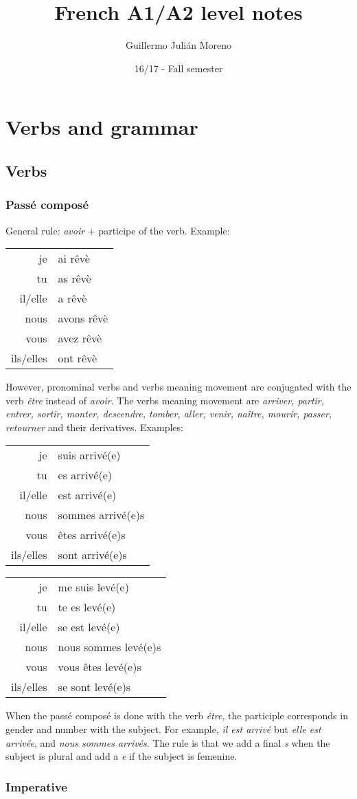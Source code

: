 \documentclass[palatino]{nicenotes}
\title{French A1/A2 level notes}
\author{Guillermo Julián Moreno}
\date{16/17 - Fall semester}
\newcommand{\conjug}[6]{\begin{tabular}{rl}
je & #1 \\
tu & #2 \\
il/elle & #3 \\
nous & #4 \\
vous & #5 \\
ils/elles & #6 \\
\end{tabular}}
\begin{document}
\frontmatter
\pagestyle{plain}
\maketitle

\tableofcontents
\mainmatter


\chapter{Verbs and grammar}

\section{Verbs}

\subsection{Passé composé}

General rule: \textit{avoir} + participe of the verb. Example:

\conjug
	{ai rêvè}
	{as rêvè}
	{a rêvè}
	{avons rêvè}
	{avez rêvè}
	{ont rêvè}

However, pronominal verbs and verbs meaning movement are conjugated with the verb \textit{être} instead of \textit{avoir}. The verbs meaning movement are \textit{arriver, partir, entrer, sortir, monter, descendre, tomber, aller, venir, naître, mourir, passer, retourner} and their derivatives. Examples:


\begin{minipage}{0.45\textwidth}
\centering
\conjug
	{suis arrivé(e)}
	{es arrivé(e)}
	{est arrivé(e)}
	{sommes arrivé(e)s}
	{êtes arrivé(e)s}
	{sont arrivé(e)s}
\end{minipage}
\begin{minipage}{0.45\textwidth}
\centering
\conjug
	{me suis levé(e)}
	{te es levé(e)}
	{se est levé(e)}
	{nous sommes levé(e)s}
	{vous êtes levé(e)s}
	{se sont levé(e)s}
\end{minipage}

When the passé composé is done with the verb \textit{être}, the participle corresponds in gender and number with the subject. For example, \textit{il est arrivé} but \textit{elle est arrivée}, and \textit{nous sommes arrivés}. The rule is that we add a final \textit{s} when the subject is plural and add a \textit{e} if the subject is femenine.

\subsection{Imperative}
\end{document}
